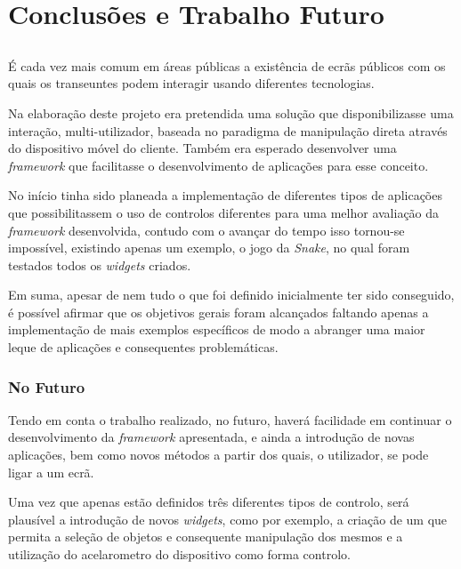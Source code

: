 \chapter{Conclusões e Trabalho Futuro} \label{chap:concl}

\section*{}

É cada vez mais comum em áreas públicas a existência de ecrãs públicos com os quais os transeuntes podem interagir usando diferentes tecnologias.

Na elaboração deste projeto era pretendida uma solução que disponibilizasse uma interação, multi-utilizador, baseada no paradigma de manipulação direta através do dispositivo móvel do cliente. Também era esperado desenvolver uma \textit{framework} que facilitasse o desenvolvimento de aplicações para esse conceito.

No início tinha sido planeada a implementação de diferentes tipos de aplicações que possibilitassem o uso de controlos diferentes para uma melhor avaliação da \textit{framework} desenvolvida, contudo com o avançar do tempo isso tornou-se impossível, existindo apenas um exemplo, o jogo da \textit{Snake}, no qual foram testados todos os \textit{widgets} criados. 

Em suma, apesar de nem tudo o que foi definido inicialmente ter sido conseguido, é possível afirmar que os objetivos gerais foram alcançados faltando apenas a implementação de mais exemplos específicos de modo a abranger uma maior leque de aplicações e consequentes problemáticas.

\subsection*{No Futuro}

Tendo em conta o trabalho realizado, no futuro, haverá facilidade em continuar o desenvolvimento da \textit{framework} apresentada, e ainda a introdução de novas aplicações, bem como novos métodos a partir dos quais, o utilizador, se pode ligar a um ecrã.

Uma vez que apenas estão definidos três diferentes tipos de controlo, será plausível a introdução de novos \textit{widgets}, como por exemplo, a criação de um que permita a seleção de objetos e consequente manipulação dos mesmos e a utilização do acelarometro do dispositivo como forma controlo.

